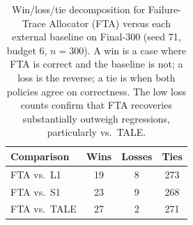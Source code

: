 \begin{table}[t]
\centering
\caption{Win/loss/tie decomposition for Failure-Trace Allocator (FTA) versus each external baseline on
Final-300 (seed 71, budget 6, $n=300$). A win is a case where FTA is correct
and the baseline is not; a loss is the reverse; a tie is when both policies agree on
correctness. The low loss counts confirm that FTA recoveries substantially
outweigh regressions, particularly vs.\ TALE.}
\label{tab:wlt}
\small
\begin{tabularx}{\textwidth}{@{}>{\raggedright\arraybackslash}Xccc@{}}
\toprule
Comparison & Wins & Losses & Ties \\
\midrule
FTA vs.\ L1   & 19 & 8 & 273 \\
FTA vs.\ S1   & 23 & 9 & 268 \\
FTA vs.\ TALE & 27 & 2 & 271 \\
\bottomrule
\end{tabularx}
\end{table}
